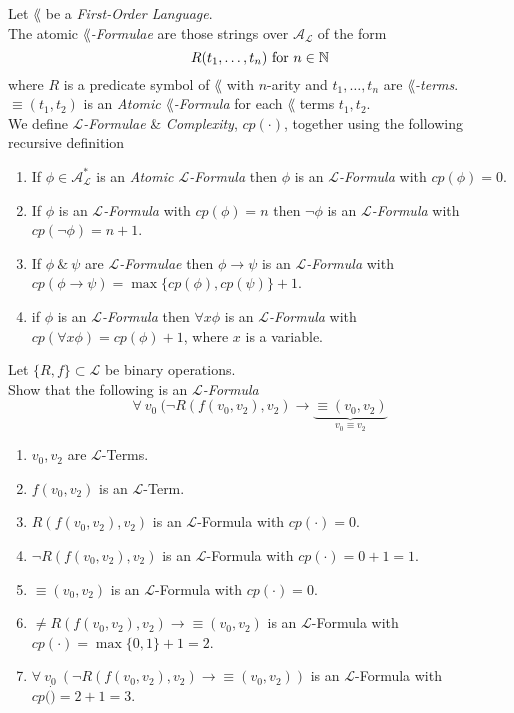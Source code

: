 \documentclass[11pt,a4paper]{article}
\begin{document}
Let $\lang$ be a \textit{First-Order Language}.\\
The atomic $\lang$\textit{-Formulae} are those strings over $\mathcal{A_L}$ of the form
$$R(t_1,\dots,t_n)\text{ for }n\in\mathbb{N}$$
where $R$ is a predicate symbol of $\lang$ with $n$-arity and $t_1,\dots,t_n$ are $\lang$\textit{-terms}.\\
\nb $\equiv(t_1,t_2)$ is an \textit{Atomic $\lang$-Formula} for each $\lang$ terms $t_1,t_2$.\\

We define \textit{$\mathcal{L}$-Formulae} \& \textit{Complexity}, $cp(\cdot)$, together using the following recursive definition
\begin{enumerate}
	\item If $\phi\in\mathcal{A}^*_\mathcal{L}$ is an \textit{Atomic $\mathcal{L}$-Formula} then $\phi$ is an \textit{$\mathcal{L}$-Formula} with $cp(\phi)=0$.
	\item If $\phi$ is an \textit{$\mathcal{L}$-Formula} with $cp(\phi)=n$ then $\neg\phi$ is an \textit{$\mathcal{L}$-Formula} with $cp(\neg\phi)=n+1$.
	\item If $\phi\ \&\ \psi$ are \textit{$\mathcal{L}$-Formulae} then $\phi\to\psi$ is an \textit{$\mathcal{L}$-Formula} with ${cp(\phi\to\psi)=\max\{cp(\phi),cp(\psi)\}+1}$.
	\item if $\phi$ is an \textit{$\mathcal{L}$-Formula} then $\forall x\phi$ is an \textit{$\mathcal{L}$-Formula} with $cp(\forall x\phi)=cp(\phi)+1$, where $x$ is a variable.
\end{enumerate}


Let $\{R,f\}\subset\mathcal{L}$ be binary operations.\\
Show that the following is an \textit{$\mathcal{L}$-Formula}
$$\forall\ v_0\ (\neg R(f(v_0,v_2),v_2)\longrightarrow\underbrace{\equiv(v_0,v_2)}_{v_0\equiv v_2}$$
\begin{enumerate}
	\item $v_0,v_2$ are $\mathcal{L}$-Terms.
	\item $f(v_0,v_2)$ is an $\mathcal{L}$-Term.
	\item $R(f(v_0,v_2),v_2)$ is an $\mathcal{L}$-Formula with $cp(\cdot)=0$.
	\item $\neg R(f(v_0,v_2),v_2)$ is an $\mathcal{L}$-Formula with $cp(\cdot)=0+1=1$.
	\item $\equiv(v_0,v_2)$ is an $\mathcal{L}$-Formula with $cp(\cdot)=0$.
	\item $\neq R(f(v_0,v_2),v_2)\longrightarrow\equiv(v_0,v_2)$ is an $\mathcal{L}$-Formula with $cp(\cdot)=\max\{0,1\}+1=2$.
	\item $\forall\ v_0\ (\neg R(f(v_0,v_2),v_2)\longrightarrow\equiv(v_0,v_2))$ is an $\mathcal{L}$-Formula with $cp(\dot)=2+1=3$.
\end{enumerate}
\end{document}
